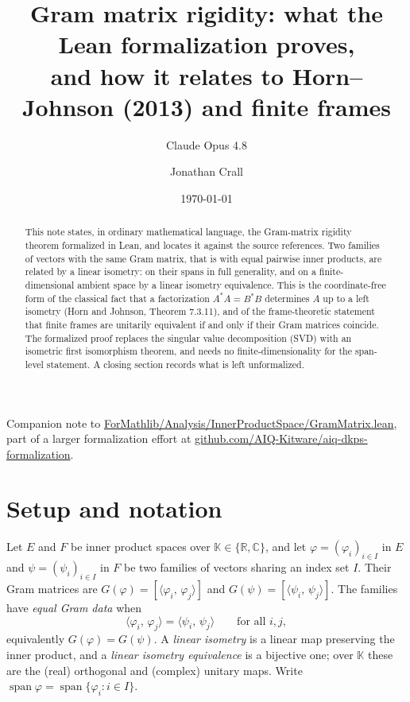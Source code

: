 \documentclass[11pt]{article}
\title{Gram matrix rigidity: what the Lean formalization proves,\\
and how it relates to Horn--Johnson (2013) and finite frames}
\author{Claude Opus 4.8 \and Jonathan Crall}
\date{\today}
\newcommand{\inner}[2]{\langle #1,\,#2\rangle}
\newcommand{\adj}{^{*}}
\newcommand{\KK}{\mathbb K}
\newcommand{\gram}{G}
\DeclareMathOperator{\spann}{span}
\theoremstyle{remark}
\begin{document}
\maketitle

\begin{abstract}
This note states, in ordinary mathematical language, the Gram-matrix rigidity
theorem formalized in Lean, and locates it against the source references.  Two
families of vectors with the same Gram matrix, that is with equal pairwise inner
products, are related by a linear isometry: on their spans in full generality,
and on a finite-dimensional ambient space by a linear isometry equivalence.  This
is the coordinate-free form of the classical fact that a factorization
$A\adj A=B\adj B$ determines $A$ up to a left isometry (Horn and Johnson,
Theorem 7.3.11), and of the frame-theoretic statement that finite frames are
unitarily equivalent if and only if their Gram matrices coincide.  The formalized
proof replaces the singular value decomposition (SVD) with an isometric first
isomorphism theorem, and needs no finite-dimensionality for the span-level
statement.  A closing section records what is left unformalized.
\end{abstract}

\vspace{1.5em}
\noindent Companion note to \href{https://github.com/AIQ-Kitware/aiq-dkps-formalization/blob/37d857e52be20d145cb90f29e8fe5d2a0928c3d1/ForMathlib/Analysis/InnerProductSpace/GramMatrix.lean}{ForMathlib/Analysis/InnerProductSpace/GramMatrix.lean}, part of a larger formalization effort at \href{https://github.com/AIQ-Kitware/aiq-dkps-formalization}{github.com/AIQ-Kitware/aiq-dkps-formalization}.

\section{Setup and notation}

Let $E$ and $F$ be inner product spaces over $\KK\in\{\mathbb R,\mathbb C\}$, and
let $\varphi=(\varphi_i)_{i\in I}$ in $E$ and $\psi=(\psi_i)_{i\in I}$ in $F$ be
two families of vectors sharing an index set $I$.  Their Gram matrices are
$\gram(\varphi)=[\inner{\varphi_i}{\varphi_j}]$ and
$\gram(\psi)=[\inner{\psi_i}{\psi_j}]$.  The families have \emph{equal Gram data}
when
\begin{equation}\label{eq:equalgram}
  \inner{\varphi_i}{\varphi_j}=\inner{\psi_i}{\psi_j}\qquad\text{for all }i,j,
\end{equation}
equivalently $\gram(\varphi)=\gram(\psi)$.  A \emph{linear isometry} is a linear
map preserving the inner product, and a \emph{linear isometry equivalence} is a
bijective one; over $\KK$ these are the (real) orthogonal and (complex) unitary
maps.  Write $\spann\varphi=\spann\{\varphi_i:i\in I\}$.
\end{document}
